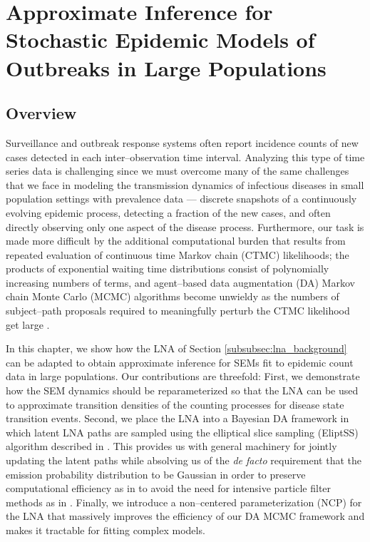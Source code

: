 \chapter{Approximate Inference for Stochastic Epidemic Models of Outbreaks in Large Populations}
\label{chap:lna_for_sems}

\section{Overview}
\label{sec:lna_overview}

Surveillance and outbreak response systems often report incidence counts of new cases detected in each inter--observation time interval. Analyzing this type of time series data is challenging since we must overcome many of the same challenges that we face in modeling the transmission dynamics of infectious diseases in small population settings with prevalence data --- discrete snapshots of a continuously evolving epidemic process, detecting a fraction of the new cases, and often directly observing only one aspect of the disease process. Furthermore, our task is made more difficult by the additional computational burden that results from repeated evaluation of continuous time Markov chain (CTMC) likelihoods; the products of exponential waiting time distributions consist of polynomially increasing numbers of terms, and agent--based data augmentation (DA) Markov chain Monte Carlo (MCMC) algorithms become unwieldy as the numbers of subject--path proposals required to meaningfully perturb the CTMC likelihood get large \cite{fintzi2017efficient}. 

In this chapter, we show how the LNA of Section \ref{subsubsec:lna_background} can be adapted to obtain approximate inference for SEMs fit to epidemic count data in large populations. Our contributions are threefold: First, we demonstrate how the SEM dynamics should be reparameterized so that the LNA can be used to approximate transition densities of the counting processes for disease state transition events. Second, we place the LNA into a Bayesian DA framework in which latent LNA paths are sampled using the elliptical slice sampling (EliptSS) algorithm described in \cite{murray2010}. This provides us with general machinery for jointly updating the latent paths while absolving us of the \textit{de facto} requirement that the emission probability distribution to be Gaussian in order to preserve computational efficiency as in \cite{fearnhead2014,komorowski2009,ross2012parameter,ross2009parameter} to avoid the need for intensive particle filter methods as in \cite{golightly2015delayed}. Finally, we introduce a non--centered parameterization (NCP) for the LNA that massively improves the efficiency of our DA MCMC framework and makes it tractable for fitting complex models. 

